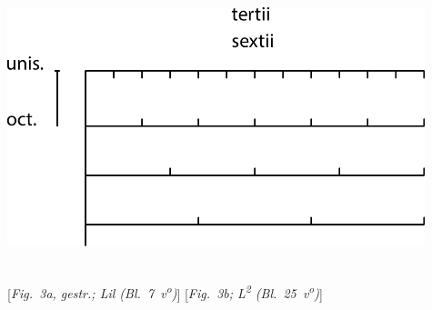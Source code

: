 \hspace*{4mm}
\begin{minipage}[t]{0.5\textwidth}
\includegraphics[width=0.91\textwidth]{gesamttex/edit_VIII,3/images/LH_37_01_001-002,003-008,025_d3b.pdf}
\end{minipage}
\newline
\noindent
\\
\hspace*{0.5mm} [\textit{Fig.~3a, gestr.; Lil (Bl.~7~v\textsuperscript{o}\!)}\label{LH_37_01_007v_f-3}]\hspace*{42mm} [\textit{Fig.~3b; L\textsuperscript{2}\! (Bl.~25~v\textsuperscript{o}\!)}]
\pend
%
%
%
